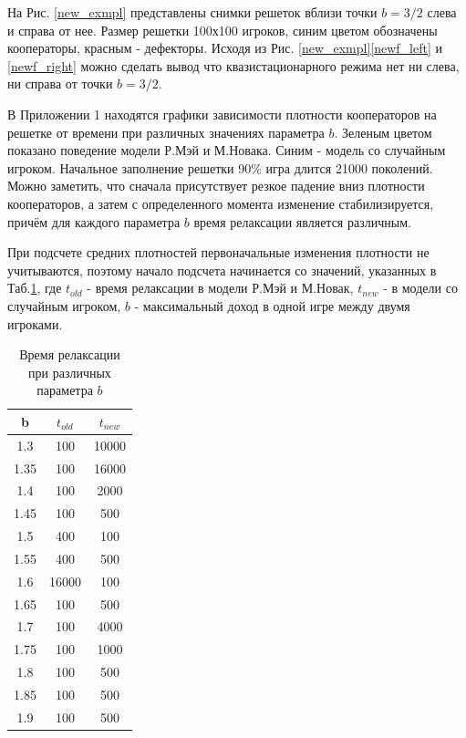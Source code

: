 \documentclass[a4paper]{article}
\begin{document}
	\par На Рис. \ref{new_exmpl} представлены снимки решеток вблизи точки $b=3/2$ слева и справа от нее. Размер решетки 100х100 игроков, синим цветом обозначены кооператоры, красным - дефекторы. Исходя из Рис. \ref{new_exmpl}\ref{newf_left} и \ref{newf_right} можно сделать вывод что квазистационарного режима нет ни слева, ни справа от точки $b=3/2$.
		
	\par В Приложении 1 находятся графики зависимости плотности кооператоров на решетке 
	от времени при различных значениях параметра $b$. Зеленым цветом показано поведение
	модели Р.Мэй и М.Новака. Синим - модель со случайным игроком. Начальное заполнение решетки 90$\%$ игра длится 21000 поколений. Можно заметить, что сначала присутствует резкое падение вниз плотности кооператоров, а затем с определенного момента изменение 
	стабилизируется, причём для каждого параметра $b$ время релаксации является различным.
	
	\par При подсчете средних плотностей первоначальные изменения плотности не учитываются, поэтому начало подсчета начинается со значений, указанных в Таб.\ref{slice_tab}, где $t_{old}$ - время релаксации в модели Р.Мэй и М.Новак,  $t_{new}$ - в модели со случайным игроком,
	$b$ - максимальный доход в одной игре между двумя игроками.
	
	
	\begin{center}
	\begin{table}[H]
			
	\centering
		\begin{tabular}[H]{|c|c|c|}
			\hline 
			b&$t_{old}$& $t_{new} $ \\
			\hline 
			1.3& 100 & 10000 \\ 
			\hline 
			1.35& 100 & 16000 \\ 
			\hline 
			1.4& 100 & 2000 \\ 
			\hline 
			1.45& 100 & 500 \\ 
			\hline 
			1.5& 400 & 100 \\ 
			\hline 
			1.55& 400 & 500 \\ 
			\hline 
			1.6& 16000 & 100 \\ 
			\hline 
			1.65& 100 & 500 \\ 
			\hline 
			1.7& 100 & 4000 \\ 
			\hline 
			1.75& 100 & 1000 \\ 
			\hline 
			1.8& 100 & 500 \\ 
			\hline 
			1.85& 100 & 500 \\ 
			\hline 
			1.9& 100 & 500 \\ 
			\hline 
		\end{tabular}
		\caption{Время релаксации при различных параметра $b$}
		
		\label{slice_tab}
	\end{table}
	\end{center}	
\end{document}
